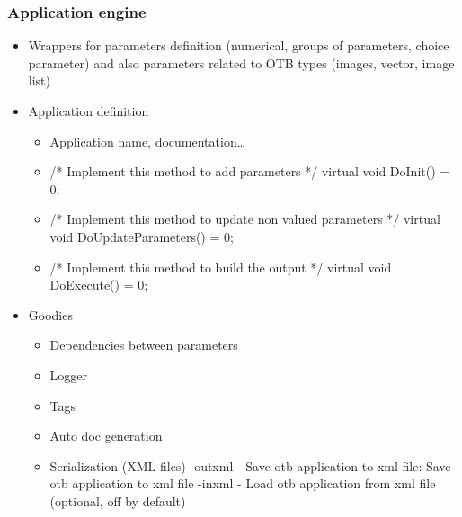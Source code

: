\documentclass[8pt]{beamer}
\begin{document}
\begin{frame}
\frametitle{Application engine}
\begin{itemize}
\item Wrappers for parameters definition (numerical, groups of parameters,
choice parameter) and also
parameters related to OTB types (images, vector, image list)
\item Application definition  
\begin{itemize}
\item Application name, documentation\ldots
\item   /* Implement this method to add parameters */ virtual void DoInit() = 0;
\item /* Implement this method to update non valued parameters */ virtual void DoUpdateParameters() = 0;
\item /* Implement this method to build the output */ virtual void DoExecute() = 0;
\end{itemize}
\item Goodies
\begin{itemize}
\item Dependencies between parameters
\item Logger
\item Tags
\item Auto doc generation
\item Serialization (XML files) 
-outxml - Save otb application to xml file: Save otb application to xml file
-inxml  - Load otb application from xml file  (optional, off by default)
\end{itemize}
\end{itemize}
\end{frame}
\end{document}
